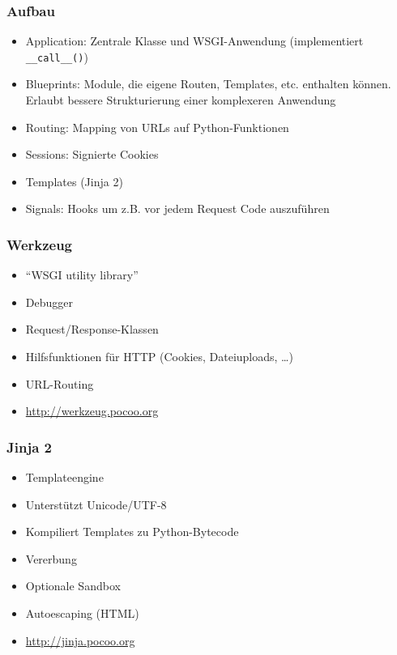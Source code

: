 \documentclass{beamer}
\begin{document}
\begin{frame}
  \frametitle{Aufbau}
  \begin{itemize}
    \item Application: Zentrale Klasse und WSGI-Anwendung (implementiert \lstinline{__call__()})
    \item Blueprints: Module, die eigene Routen, Templates, etc. enthalten können. Erlaubt bessere
          Strukturierung einer komplexeren Anwendung
    \item Routing: Mapping von URLs auf Python-Funktionen
    \item Sessions: Signierte Cookies
    \item Templates (Jinja 2)
    \item Signals: Hooks um z.B. vor jedem Request Code auszuführen
  \end{itemize}
\end{frame}

\begin{frame}
  \frametitle{Werkzeug}
  \begin{itemize}
    \item \enquote{WSGI utility library}
    \item Debugger
    \item Request/Response-Klassen
    \item Hilfsfunktionen für HTTP (Cookies, Dateiuploads, \ldots)
    \item URL-Routing
    \item \url{http://werkzeug.pocoo.org}
  \end{itemize}
\end{frame}

\begin{frame}
  \frametitle{Jinja 2}
  \begin{itemize}
    \item Templateengine
    \item Unterstützt Unicode/UTF-8
    \item Kompiliert Templates zu Python-Bytecode
    \item Vererbung
    \item Optionale Sandbox
    \item Autoescaping (HTML)
    \item \url{http://jinja.pocoo.org}
  \end{itemize}
\end{frame}
\end{document}
